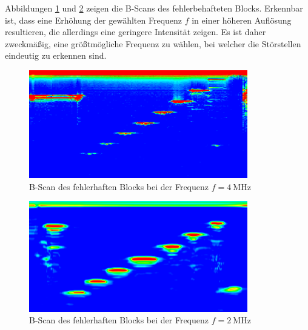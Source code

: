 Abbildungen \ref{fig:b_scan_4} und \ref{fig:b_scan_2} zeigen die B-Scans des fehlerbehafteten Blocks.
Erkennbar ist, dass eine Erhöhung der gewählten Frequenz $f$ in einer höheren Auflösung resultieren, die allerdings eine geringere Intensität zeigen.
Es ist daher zweckmäßig, eine größtmögliche Frequenz zu wählen, bei welcher die Störstellen eindeutig zu erkennen sind.
\begin{figure}[hp]
	\centering
	\includegraphics[width=0.85\textwidth]{Bilder/Block_4Mhz.png}
	\caption{B-Scan des fehlerhaften Blocks bei der Frequenz $f=\SI{4}{\mega\hertz}$}
	\label{fig:b_scan_4}
\end{figure}
\begin{figure}[hp]
	\centering
	\includegraphics[width=0.85\textwidth]{Bilder/Bscan_2.png}
	\caption{B-Scan des fehlerhaften Blocks bei der Frequenz $f=\SI{2}{\mega\hertz}$}
	\label{fig:b_scan_2}
\end{figure}
\newpage
